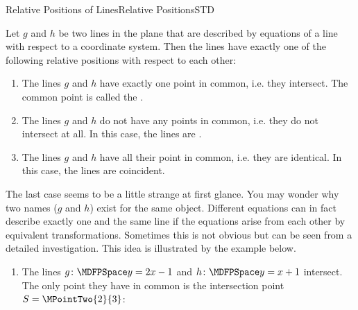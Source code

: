 \begin{MXContent}{Relative Positions of Lines}{Relative Positions}{STD}
\begin{MInfo}
Let $g$ and $h$ be two lines in the plane that are described by equations of a line with respect to a coordinate system. Then the lines have exactly
one of the following relative positions with respect to each other:
\begin{enumerate}
 \item The lines $g$ and $h$ have exactly one point in common, i.e. they intersect. The common point is called the .
 \item The lines $g$ and $h$ do not have any points in common, i.e. they do not intersect at all. In this case, the lines are .
 \item The lines $g$ and $h$ have all their point in common, i.e. they are identical. In this case, the lines are coincident.
\end{enumerate}
\end{MInfo}

The last case seems to be a little strange at first glance. You may wonder why two names ($g$ and $h$) exist for the same object. Different equations can in fact describe 
exactly one and the same line if the equations arise from each other by equivalent transformations. Sometimes this is not obvious but can be seen from a detailed investigation. This idea is illustrated by the 
example below.

\begin{MExample}
\begin{enumerate}
 \item The lines $g\colon\MDFPSpace y=2x-1$ and $h\colon\MDFPSpace y=x+1$ intersect. The only point they have in common is the intersection
  point $S=\MPointTwo{2}{3}$:
 \begin{center}
\end{center} 


\end{enumerate}
\end{MExample}
\end{MXContent}
